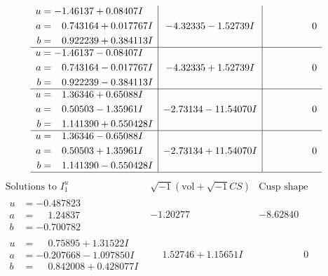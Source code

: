 \documentclass[1p]{elsarticle_modified}
\theoremstyle{definition}
\newcommand{\I}{\sqrt{-1}}
\begin{document}
$$\begin{array}{c|c|c}
\begin{aligned}
u &= -1.46137 + 0.08407 I \\
a &= \phantom{-}0.743164 + 0.017767 I \\
b &= \phantom{-}0.922239 + 0.384113 I\end{aligned}
 & -4.32335 - 1.52739 I & \phantom{-0.000000 } 0 \\ \hline\begin{aligned}
u &= -1.46137 - 0.08407 I \\
a &= \phantom{-}0.743164 - 0.017767 I \\
b &= \phantom{-}0.922239 - 0.384113 I\end{aligned}
 & -4.32335 + 1.52739 I & \phantom{-0.000000 } 0 \\ \hline\begin{aligned}
u &= \phantom{-}1.36346 + 0.65088 I \\
a &= \phantom{-}0.50503 - 1.35961 I \\
b &= \phantom{-}1.141390 + 0.550428 I\end{aligned}
 & -2.73134 - 11.54070 I & \phantom{-0.000000 } 0 \\ \hline\begin{aligned}
u &= \phantom{-}1.36346 - 0.65088 I \\
a &= \phantom{-}0.50503 + 1.35961 I \\
b &= \phantom{-}1.141390 - 0.550428 I\end{aligned}
 & -2.73134 + 11.54070 I & \phantom{-0.000000 } 0\\
 \hline 
 \end{array}$$\newpage$$\begin{array}{c|c|c}  
\text{Solutions to }I^u_{1}& \I (\text{vol} + \sqrt{-1}CS) & \text{Cusp shape}\\
 \hline 
\begin{aligned}
u &= -0.487823\phantom{ +0.000000I} \\
a &= \phantom{-}1.24837\phantom{ +0.000000I} \\
b &= -0.700782\phantom{ +0.000000I}\end{aligned}
 & -1.20277\phantom{ +0.000000I} & -8.62840\phantom{ +0.000000I} \\ \hline\begin{aligned}
u &= \phantom{-}0.75895 + 1.31522 I \\
a &= -0.207668 - 1.097850 I \\
b &= \phantom{-}0.842008 + 0.428077 I\end{aligned}
 & \phantom{-}1.52746 + 1.15651 I & \phantom{-0.000000 } 0 \\ \hline\begin{aligned}

\end{aligned}
\end{array}$$
\end{document}
